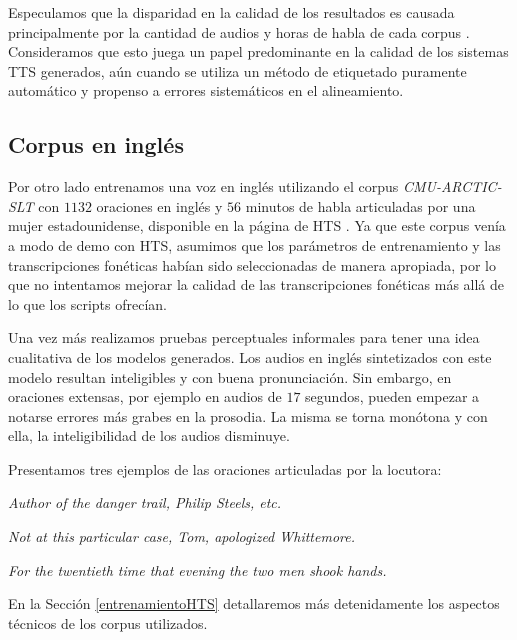 
Especulamos que la disparidad en la calidad de los resultados es causada principalmente por la cantidad de audios y horas de habla de cada corpus \cite{phoneticAndProsodic}. Consideramos que esto juega un papel predominante en la calidad de los sistemas TTS generados, aún cuando se utiliza un método de etiquetado puramente automático y propenso a errores sistemáticos en el alineamiento.


\subsection{Corpus en inglés}

Por otro lado entrenamos una voz en inglés utilizando el corpus \textit{CMU-ARCTIC-SLT} \cite{cmuArtic} con $1132$ oraciones en inglés y $56$ minutos de habla articuladas por una mujer estadounidense, disponible en la página de HTS \cite{hts}. Ya que este corpus venía a modo de demo con HTS, asumimos que los parámetros de entrenamiento y las transcripciones fonéticas habían sido seleccionadas de manera apropiada, por lo que no intentamos mejorar la calidad de las transcripciones fonéticas más allá de lo que los scripts ofrecían. 

Una vez más realizamos pruebas perceptuales informales para tener una idea cualitativa de los modelos generados. Los audios en inglés sintetizados con este modelo resultan inteligibles y con buena pronunciación. Sin embargo, en oraciones extensas, por ejemplo en audios de $17$ segundos, pueden empezar a notarse errores más grabes en la prosodia. La misma se torna monótona y con ella, la inteligibilidad de los audios disminuye.

Presentamos tres ejemplos de las oraciones articuladas por la locutora:

\indent\indent \textit{Author of the danger trail, Philip Steels, etc.}

\indent\indent \textit{Not at this particular case, Tom, apologized Whittemore.}

\indent\indent \textit{For the twentieth time that evening the two men shook hands.}

En la Sección \ref{entrenamientoHTS} detallaremos más detenidamente los aspectos técnicos de los corpus utilizados.

